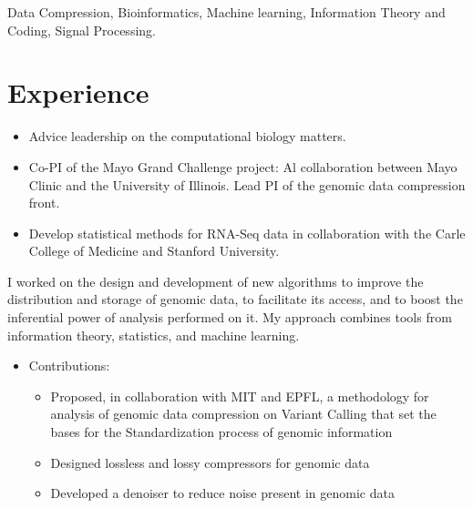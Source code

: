 \documentclass[11pt,a4paper,sans]{moderncv}        %
\begin{document}
Data Compression, Bioinformatics, Machine learning, Information Theory and Coding, Signal Processing.


\section{Experience}


\begin{itemize}
\item Advice leadership on the computational biology matters.
\item Co-PI of the Mayo Grand Challenge project: Al collaboration between Mayo Clinic and the University of Illinois. Lead PI of the genomic data compression front.
\item Develop statistical methods for RNA-Seq data in collaboration with the Carle College of Medicine and Stanford University.\\
\end{itemize}


I worked on the design and development of new algorithms to improve the distribution and storage of genomic data, to facilitate its access, and to boost the inferential power of analysis performed on it. My approach combines tools from information theory, statistics, and machine learning.

\begin{itemize}
\item {Contributions:}
\begin{itemize}
\item Proposed, in collaboration with MIT and EPFL, a methodology for analysis of genomic data compression on Variant Calling that set the bases for the Standardization process of genomic information
\item Designed lossless and lossy compressors for genomic data
\item Developed a denoiser to reduce noise present in genomic data \\
\end{itemize}
\end{itemize}
\end{document}
